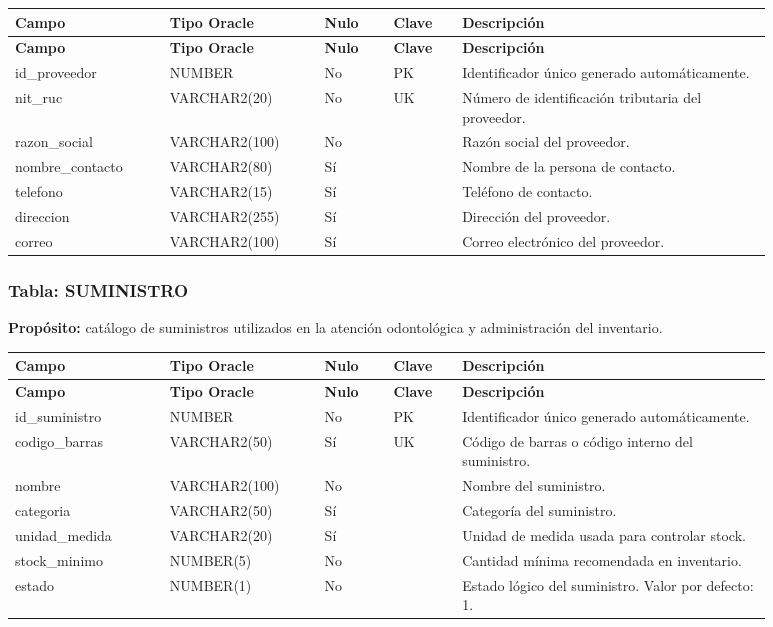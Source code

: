 \begin{longtable}{p{0.18\linewidth}p{0.18\linewidth}p{0.08\linewidth}p{0.08\linewidth}p{0.36\linewidth}}
\toprule
\textbf{Campo} & \textbf{Tipo Oracle} & \textbf{Nulo} & \textbf{Clave} & \textbf{Descripción} \\
\midrule
\endfirsthead
\toprule
\textbf{Campo} & \textbf{Tipo Oracle} & \textbf{Nulo} & \textbf{Clave} & \textbf{Descripción} \\
\midrule
\endhead
id\_proveedor & NUMBER & No & PK & Identificador único generado automáticamente. \\
nit\_ruc & VARCHAR2(20) & No & UK & Número de identificación tributaria del proveedor. \\
razon\_social & VARCHAR2(100) & No &  & Razón social del proveedor. \\
nombre\_contacto & VARCHAR2(80) & Sí &  & Nombre de la persona de contacto. \\
telefono & VARCHAR2(15) & Sí &  & Teléfono de contacto. \\
direccion & VARCHAR2(255) & Sí &  & Dirección del proveedor. \\
correo & VARCHAR2(100) & Sí &  & Correo electrónico del proveedor. \\
\bottomrule
\end{longtable}



\subsubsection{Tabla: SUMINISTRO}

\textbf{Propósito:} catálogo de suministros utilizados en la atención odontológica y administración del inventario.\par

\begin{longtable}{p{0.18\linewidth}p{0.18\linewidth}p{0.08\linewidth}p{0.08\linewidth}p{0.36\linewidth}}
\toprule
\textbf{Campo} & \textbf{Tipo Oracle} & \textbf{Nulo} & \textbf{Clave} & \textbf{Descripción} \\
\midrule
\endfirsthead
\toprule
\textbf{Campo} & \textbf{Tipo Oracle} & \textbf{Nulo} & \textbf{Clave} & \textbf{Descripción} \\
\midrule
\endhead
id\_suministro & NUMBER & No & PK & Identificador único generado automáticamente. \\
codigo\_barras & VARCHAR2(50) & Sí & UK & Código de barras o código interno del suministro. \\
nombre & VARCHAR2(100) & No &  & Nombre del suministro. \\
categoria & VARCHAR2(50) & Sí &  & Categoría del suministro. \\
unidad\_medida & VARCHAR2(20) & Sí &  & Unidad de medida usada para controlar stock. \\
stock\_minimo & NUMBER(5) & No &  & Cantidad mínima recomendada en inventario. \\
estado & NUMBER(1) & No &  & Estado lógico del suministro. Valor por defecto: 1. \\
\bottomrule
\end{longtable}




